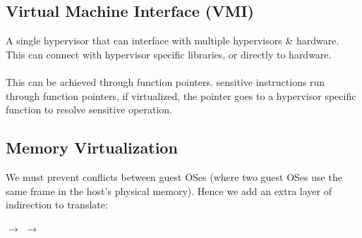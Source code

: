 \documentclass{report}
\begin{document}
\subsection*{Virtual Machine Interface (VMI)}
A single hypervisor  that can interface with multiple hypervisors \& hardware. This  can connect with hypervisor specific libraries, or directly to hardware.
\\
\\ This can be achieved through function pointers. sensitive instructions run through function pointers, if virtualized, the pointer goes to a hypervisor specific function to resolve sensitive operation.

\subsection*{Memory Virtualization}
We must prevent conflicts between guest OSes (where two guest OSes use the same frame in the host's physical memory). Hence we add an extra layer of indirection to translate:
\\ \centerline{ $\to$  $\to$ }
\end{document}

